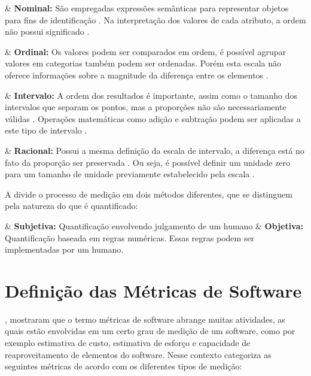 	\begin{easylist}[itemize]

& \textbf{Nominal:} São empregadas expressões semânticas para representar objetos para fins de identificação \cite{pandian_software_2004}. Na interpretação dos valores de cada atributo, a ordem não possui significado \cite{Meirelles2013}.

& \textbf{Ordinal:} Os valores podem ser comparados em ordem, é possível agrupar valores em categorias também podem ser ordenadas. Porém esta escala não oferece informações sobre a magnitude da diferença entre os elementos \cite{metricsandmodels}.


& \textbf{Intervalo:} A ordem dos resultados é importante, assim como o tamanho dos intervalos que separam os pontos, mas a proporções não são necessariamente válidas \cite{Meirelles2013}. Operações matemáticas como adição e subtração podem ser aplicadas a este tipo de intervalo \cite{metricsandmodels}.

& \textbf{Racional:} Possui a mesma definição da escala de intervalo, a diferença está no fato da proporção ser preservada \cite{Meirelles2013}. Ou seja, é possível definir um unidade zero para um tamanho de unidade previamente estabelecido pela escala \cite{metricsandmodels}.


\end{easylist}
	
	A  divide o processo de medição em dois métodos diferentes, que se distinguem pela natureza do que é quantificado:
	
	\begin{easylist}[itemize]

	& \textbf{Subjetiva:} Quantificação envolvendo julgamento de um humano
	& \textbf{Objetiva:} Quantificação baseada em regras numéricas. Essas regras podem ser implementadas por um humano.

	\end{easylist}



\section{Definição das Métricas de Software}

, mostraram que o termo métricas de software abrange muitas atividades, as quais estão envolvidas em um certo grau de medição de um software, como por exemplo estimativa de custo, estimativa de esforço e capacidade de reaproveitamento de elementos do software. Nesse contexto  categoriza as seguintes métricas de acordo com os diferentes tipos de medição:

